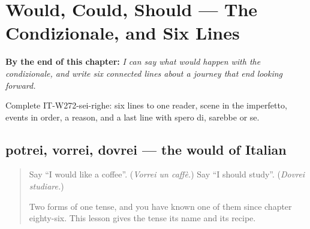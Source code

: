 
\chapter{Would, Could, Should --- The Condizionale, and Six Lines}
\label{ch:it-the-condizionale}

\begin{chapteropening}
\textbf{By the end of this chapter:} \emph{I can say what would happen with the condizionale, and write six connected lines about a journey that end looking forward.}

Complete IT-W272-sei-righe: six lines to one reader, scene in the imperfetto, events in order, a reason, and a last line with spero di, sarebbe or se.
\end{chapteropening}

\section[potrei, vorrei, dovrei]{potrei, vorrei, dovrei — the would of Italian}

\label{lesson:IT-C272-potrei}



\begin{quote}
Say \textquotedblleft{}I would like a coffee\textquotedblright{}. (\emph{Vorrei un caffè.}) Say \textquotedblleft{}I should study\textquotedblright{}. (\emph{Dovrei studiare.})

Two forms of one tense, and you have known one of them since chapter eighty-six. This lesson gives the tense its name and its recipe.
\end{quote}

